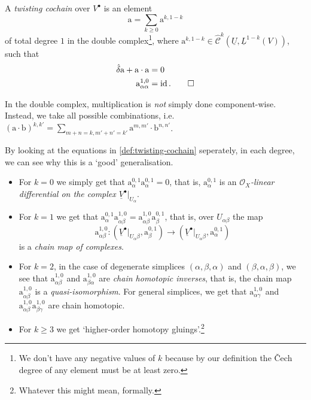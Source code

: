 \documentclass[11pt,notitlepage]{article}
\numberwithin{equation}{subsection}
\DeclareMathOperator{\id}{id}
\renewcommand{\C}{\mathscr{C}}
\begin{document}
                \begin{definition}\label{def:twisting-cochain}
                    A \textit{twisting cochain} over $V^\bullet$ is an element
                    \[\mathrm{a}=\sum_{k\geqslant0}\mathrm{a}^{k,1-k}\]
                    of total degree $1$ in the double complex\footnote{We don't have any negative values of $k$ because by our definition the Čech degree of any element must be at least zero.}, where $\mathrm{a}^{k,1-k}\in\hat{\C}^k(\underline{U},\underline{L}^{1-k}(V))$, such that
                    \begin{align*}
                        \hat{\delta}\mathrm{a}+\mathrm{a}\cdot\mathrm{a}&=0\\
                        \mathrm{a}^{1,0}_{\alpha\alpha}&=\id.\qedhere
                    \end{align*}
                \end{definition}

                \begin{note}
                    In the double complex, multiplication is \textit{not} simply done component-wise.
                    Instead, we take all possible combinations, i.e. $(\mathrm{a}\cdot\mathrm{b})^{k,k'}=\sum_{m+n=k,m'+n'=k'}\mathrm{a}^{m,m'}\cdot\mathrm{b}^{n,n'}$.
                \end{note}

                By looking at the equations in \cref{def:twisting-cochain} seperately, in each degree, we can see why this is a `good' generalisation.
                \begin{itemize}
                    \item For $k=0$ we simply get that $\mathrm{a}^{0,1}_{\alpha}\mathrm{a}^{0,1}_{\alpha}=0$, that is, $\mathrm{a}^{0,1}_{\alpha}$ is an \textit{$\mathcal{O}_X$-linear differential on the complex $\underline{V}^\bullet|_{U_\alpha}$}.
                    \item For $k=1$ we get that $\mathrm{a}^{0,1}_{\alpha}\mathrm{a}^{1,0}_{\alpha\beta} = \mathrm{a}^{1,0}_{\alpha\beta}\mathrm{a}^{0,1}_{\beta}$, that is, over $U_{\alpha\beta}$ the map
                        \[\mathrm{a}^{1,0}_{\alpha\beta}\colon (\underline{V}^\bullet|_{U_\alpha\beta},\mathrm{a}^{0,1}_{\beta})\to (\underline{V}^\bullet|_{U_\alpha\beta},\mathrm{a}^{0,1}_{\alpha})\]
                        is a \textit{chain map of complexes}.
                    \item For $k=2$, in the case of degenerate simplices $(\alpha,\beta,\alpha)$ and $(\beta,\alpha,\beta)$, we see that $\mathrm{a}^{1,0}_{\alpha\beta}$ and $\mathrm{a}^{1,0}_{\beta\alpha}$ are \textit{chain homotopic inverses}, that is, the chain map $\mathrm{a}^{1,0}_{\alpha\beta}$ is a \textit{quasi-isomorphism}.
                        For general simplices, we get that $\mathrm{a}^{1,0}_{\alpha\gamma}$ and $\mathrm{a}^{1,0}_{\alpha\beta}\mathrm{a}^{1,0}_{\beta\gamma}$ are chain homotopic.
                    \item For $k\geqslant3$ we get `higher-order homotopy gluings'.\footnote{Whatever this might mean, formally.}
                \end{itemize}
\end{document}
